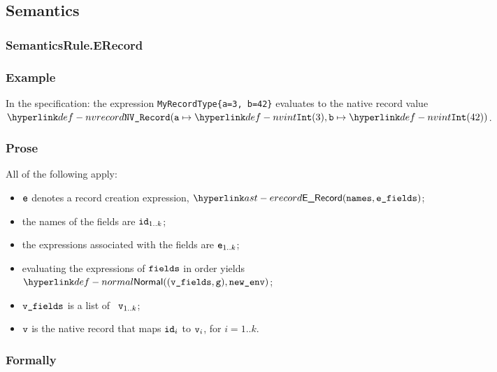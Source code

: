 \subsection{Semantics}
\subsubsection{SemanticsRule.ERecord \label{sec:SemanticsRule.ERecord}}
\subsubsection{Example}
In the specification:
the expression \verb|MyRecordType{a=3, b=42}| evaluates to the native record value \\
$\nvrecord{\va\mapsto\nvint(3), \vb\mapsto\nvint(42)}$.

\subsubsection{Prose}
All of the following apply:
\begin{itemize}
\item $\ve$ denotes a record creation expression, $\ERecord(\names, \efields)$;
\item the names of the fields are $\id_{1..k}$;
\item the expressions associated with the fields are $\ve_{1..k}$;
\item evaluating the expressions of $\fields$ in order yields \\
      $\Normal((\vvfields,\vg), \newenv)$\ProseOrAbnormal;
\item $\vvfields$ is a list of \nativevalues\ $\vv_{1..k}$;
\item $\vv$ is the native record that maps $\id_i$ to $\vv_i$, for $i=1..k$.
\end{itemize}
\subsubsection{Formally}
\begin{mathpar}
\end{mathpar}

